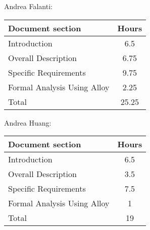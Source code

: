 Andrea Falanti:

\begin{tabular}{|l|c|}
    \hline
    Document section & Hours \\
    \hline
     Introduction & 6.5\\
     Overall Description & 6.75\\
     Specific Requirements & 9.75\\
     Formal Analysis Using Alloy & 2.25\\
     \hline
     Total & 25.25\\
     \hline
\end{tabular}
\vskip 0.3in

Andrea Huang:

\begin{tabular}{|l|c|}
    \hline
    Document section & Hours \\
    \hline
     Introduction &  6.5\\
     Overall Description & 3.5\\
     Specific Requirements & 7.5\\
     Formal Analysis Using Alloy & 1\\
     \hline
     Total & 19\\
     \hline
\end{tabular}